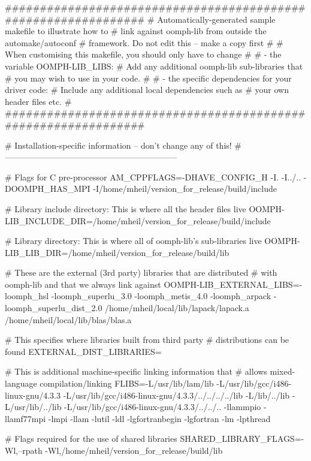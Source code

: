 \begin{DoxyCodeInclude}
###############################################################
# Automatically-generated sample makefile to illustrate how to  
# link against oomph-lib from outside the automake/autoconf
# framework. Do not edit this -- make a copy first
# 
# When customising this makefile, you should only have to change
# 
# - the variable OOMPH-LIB\_LIBS:
#         Add any additional oomph-lib sub-libraries that 
#         you may wish to use in your code. 
# 
# - the specific dependencies for your driver code: 
#         Include any additional local dependencies such as 
#         your own header files etc.
# 
###############################################################
 
 
# Installation-specific information -- don't change any of this! 
#-------------------------------------------------------------- 
 
# Flags for C pre-processor 
AM\_CPPFLAGS=-DHAVE\_CONFIG\_H -I. -I../..  -DOOMPH\_HAS\_MPI -I/home/mheil/version\_for\_release/build/include
 
# Library include directory: This is where all the header files live
OOMPH-LIB\_INCLUDE\_DIR=/home/mheil/version\_for\_release/build/include
 
# Library directory: This is where all of oomph-lib's sub-libraries live
OOMPH-LIB\_LIB\_DIR=/home/mheil/version\_for\_release/build/lib
 
# These are the external (3rd party) libraries that are distributed
# with oomph-lib and that we always link against
OOMPH-LIB\_EXTERNAL\_LIBS=-loomph\_hsl -loomph\_superlu\_3.0 -loomph\_metis\_4.0 -loomph\_arpack
       -loomph\_superlu\_dist\_2.0 /home/mheil/local/lib/lapack/lapack.a /home/mheil/local/lib/blas/blas.a
 
# This specifies where libraries built from third party 
# distributions can be found
EXTERNAL\_DIST\_LIBRARIES=
 
# This is additional machine-specific linking information that 
# allows mixed-language compilation/linking
FLIBS=-L/usr/lib/lam/lib -L/usr/lib/gcc/i486-linux-gnu/4.3.3
       -L/usr/lib/gcc/i486-linux-gnu/4.3.3/../../../../lib -L/lib/../lib -L/usr/lib/../lib -L/usr/lib/gcc/i486-linux-gnu/4.3.3/../../.. -llammpio -llamf77mpi
       -lmpi -llam -lutil -ldl -lgfortranbegin -lgfortran -lm -lpthread
 
# Flags required for the use of shared libraries 
SHARED\_LIBRARY\_FLAGS=-Wl,--rpath -Wl,/home/mheil/version\_for\_release/build/lib
 

\end{DoxyCodeInclude}
